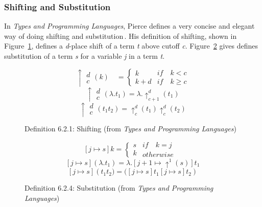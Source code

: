 \subsubsection{Shifting and Substitution}
In \textit{Types and Programming Languages}, Pierce defines a very concise and elegant way of doing shifting and substitution\,\cite[pp. 79-80]{Pierce:TypeSystems}. His definition of shifting, shown in Figure~\ref{fig:Pierce-shifting}, defines a \textit{d}-place shift of a term \textit{t} above cutoff \textit{c}. Figure~\ref{fig:Pierce-substitution} gives defines substitution of a term \textit{s} for a variable \textit{j} in a term \textit{t}.

\begin{figure}
\[\uparrow \begin{matrix} d \\ c \end{matrix}(k)\quad = \begin{cases} k \\ k+d \end{cases}\begin{matrix} if\quad k < c \\ if\quad k \ge c \end{matrix}\]
\[\uparrow \begin{matrix} d \\ c \end{matrix}(\lambda .{ t }_{ 1 }) = \lambda .{ \uparrow  }_{ c+1 }^{ d }({ t }_{ 1 })\]
\[\uparrow \begin{matrix} d \\ c \end{matrix}({ t }_{ 1 }{ t }_{ 2 }) = { \uparrow  }_{ c }^{ d }({ t }_{ 1 }) { \uparrow  }_{ c }^{ d }({ t }_{ 2 })\]
\caption{Definition 6.2.1: Shifting (from \textit{Types and Programming Languages})}
\label{fig:Pierce-shifting}
\end{figure}

\begin{figure}
\[[j\mapsto s]k=\begin{cases} s \\ k \end{cases}\begin{matrix} if\quad k=j\quad \\ otherwise \end{matrix}\]
\[[j\mapsto s](\lambda .{ t }_{ 1 })=\lambda .[j+1\mapsto { \uparrow  }^{ 1 }(s)]{ t }_{ 1 }\]
\[[j\mapsto s]({ { t }_{ 1 }{ t }_{ 2 })=( }[j\mapsto s]{ t }_{ 1 }[j\mapsto s]{ t }_{ 2 })\]
\caption{Definition 6.2.4: Substitution (from \textit{Types and Programming Languages})}
\label{fig:Pierce-substitution}
\end{figure}

